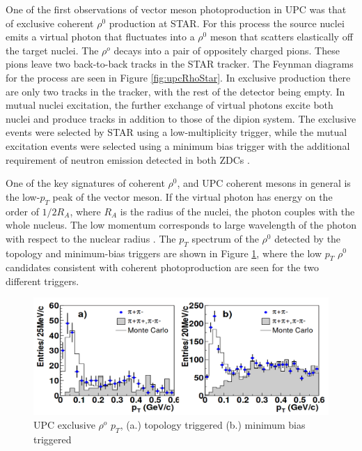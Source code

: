 One of the first observations of vector meson photoproduction in UPC was that of exclusive coherent $\rho^0$ production at STAR. For this process the source nuclei emits a virtual photon that fluctuates into a $\rho^0$ meson that scatters elastically off the target nuclei. The $\rho^o$ decays into a pair of oppositely charged pions. These pions leave two back-to-back tracks in the STAR tracker. The Feynman diagrams for the process are seen in Figure \ref{fig:upcRhoStar}. In exclusive production there are only two tracks in the tracker, with the rest of the detector being empty. In mutual nuclei excitation, the further exchange of virtual photons excite both nuclei and produce tracks in addition to those of the dipion system. The exclusive events were selected by STAR using a low-multiplicity trigger, while the mutual excitation events were selected using a minimum bias trigger with the additional requirement of neutron emission detected in both ZDCs \cite{Adler:2002sc}. 

One of the key signatures of coherent $\rho^0$, and UPC coherent mesons in general is the low-$p_T$ peak of the vector meson. If the virtual photon has energy on the order of $1/2R_{A}$, where $R_{A}$ is the radius of the nuclei, the photon couples with the whole nucleus. The low momentum corresponds to large wavelength of the photon with respect to the nuclear radius \cite{Guzey:2013taa,Frankfurt:2006wg,Baltz:2002pp,Klein:2003vd}. The $p_T$ spectrum of the $\rho^0$ detected by the topology and minimum-bias triggers are shown in Figure \ref{fig:upcRhoStarPt}, where the low $p_T$ $\rho^0$ candidates consistent with coherent photoproduction are seen for the two different triggers.

\begin{figure}[h!]
\begin{centering}
\includegraphics[width=5.5in]{Chapter2/importfigs/rho_upc_pt_star.png}
\par\end{centering}
\caption{UPC exclusive $\rho^o$ $p_T$, (a.) topology triggered (b.) minimum bias triggered \cite{Adler:2002sc} \label{fig:upcRhoStarPt}}
\end{figure}

